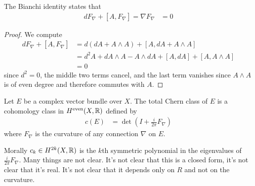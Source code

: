 \documentclass[12pt]{article}
\begin{document}
\begin{proposition}
    The Bianchi identity states that \begin{align*}
    dF_\nabla + [A, F_\nabla] = \nabla F_\nabla &= 0
\end{align*} 
\end{proposition}
\begin{proof}
    We compute \begin{align*}
        dF_\nabla + [A, F_\nabla] & = d(dA + A \wedge A) + [A, dA + A \wedge A] \\
        & = d^2 A + dA \wedge A - A \wedge dA + [A, dA] + [A, A \wedge A] \\
        & = 0
    \end{align*} since $d^2 = 0$, the middle two terms cancel, and the last term vanishes since $A \wedge A$ is of even degree and therefore commutes with $A$.
\end{proof}

\begin{definition}
    Let $E$ be a complex vector bundle over $X$. The total Chern class of $E$ is a cohomology class in $H^{\text{even}}(X, \mathbb{R})$ defined by \begin{align*}
        c(E) & = \det\left( I + \frac{i}{2\pi} F_\nabla \right)
    \end{align*} where $F_\nabla$ is the curvature of any connection $\nabla$ on $E$.
\end{definition}

Morally $c_k \in H^{2k}(X, \mathbb{R})$ is the $k$th symmetric polynomial in the eigenvalues of $\frac{i}{2\pi} F_\nabla$. Many things are not clear. It's not clear that this is a closed form, it's not clear that it's real. It's not clear that it depends only on $R$ and not on the curvature.
\end{document}
